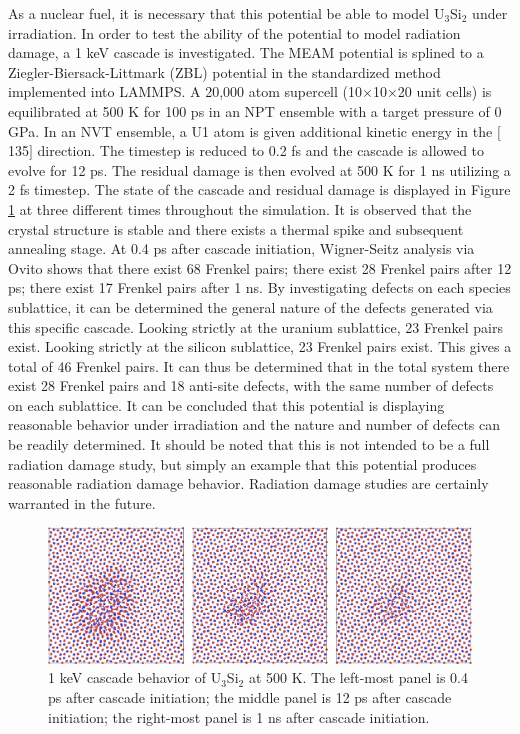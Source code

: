 \documentclass[review]{elsarticle}
\begin{document}
As a nuclear fuel, it is necessary that this potential be able to model U$_{3}$Si$_{2}$ under irradiation.  In order to test the ability of the potential to model radiation damage, a 1 keV cascade is investigated.   The MEAM potential is splined to a Ziegler-Biersack-Littmark (ZBL) \cite{zbl} potential in the standardized method implemented into LAMMPS.  A 20,000 atom supercell (10$\times$10$\times$20 unit cells) is equilibrated at 500 K for 100 ps in an NPT ensemble with a target pressure of 0 GPa.  In an NVT ensemble, a U1 atom is given additional kinetic energy in the $[$135$]$ direction.  The timestep is reduced to 0.2 fs and the cascade is allowed to evolve for 12 ps.  The residual damage is then evolved at 500 K for 1 ns utilizing a 2 fs timestep.  The state of the cascade and residual damage is displayed in Figure \ref{fig:ben6} at three different times throughout the simulation.  It is observed that the crystal structure is stable and there exists a thermal spike and subsequent annealing stage.  At 0.4 ps after cascade initiation, Wigner-Seitz analysis via Ovito \cite{ovito} shows that there exist 68 Frenkel pairs; there exist 28 Frenkel pairs after 12 ps; there exist 17 Frenkel pairs after 1 ns.  By investigating defects on each species sublattice, it can be determined the general nature of the defects generated via this specific cascade.  Looking strictly at the uranium sublattice, 23 Frenkel pairs exist.  Looking strictly at the silicon sublattice, 23 Frenkel pairs exist.  This gives a total of 46 Frenkel pairs.  It can thus be determined that in the total system there exist 28 Frenkel pairs and 18 anti-site defects, with the same number of defects on each sublattice.  It can be concluded that this potential is displaying reasonable behavior under irradiation and the nature and number of defects can be readily determined.  It should be noted that this is not intended to be a full radiation damage study, but simply an example that this potential produces reasonable radiation damage behavior.  Radiation damage studies are certainly warranted in the future.

 \begin{figure}[bt]
	\centering
	\includegraphics[width=\textwidth]{cascade_total.png}
    \caption{1 keV cascade behavior of U$_{3}$Si$_{2}$ at 500 K.  The left-most panel is 0.4 ps after cascade initiation; the middle panel is 12 ps after cascade initiation; the right-most panel is 1 ns after cascade initiation.}\label{fig:ben6}
\end{figure}
\end{document}
